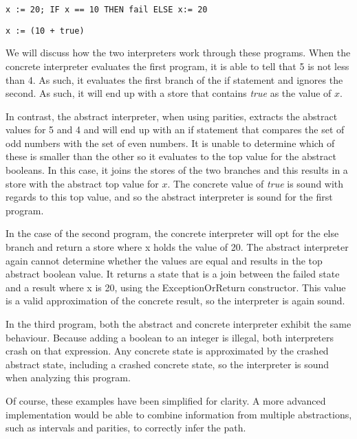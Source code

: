 \begin{lstlisting}
x := 20; IF x == 10 THEN fail ELSE x:= 20
\end{lstlisting}

\begin{lstlisting}
x := (10 + true)
\end{lstlisting}

We will discuss how the two interpreters work through these programs. When the
concrete interpreter evaluates the first program, it is able to tell that 5 is
not less than 4. As such, it evaluates the first branch of the if statement and
ignores the second. As such, it will end up with a store that contains
\textit{true} as the value of $x$.

In contrast, the abstract interpreter, when using parities, extracts the 
abstract values for 5 and 4
and will end up with an if statement that compares the set of odd numbers with
the set of even numbers. It is unable to determine which of these is smaller
than the other so it evaluates to the top value for the abstract booleans. In
this case, it joins the stores of the two branches and this results in a store
with the abstract top value for $x$. The concrete value of \textit{true} is
sound with regards to this top value, and so the abstract interpreter is sound
for the first program.

In the case of the second program, the concrete interpreter will opt for the
else branch and return a store where x holds the value of 20. The abstract
interpreter again cannot determine whether the values are equal and results in
the top abstract boolean value. It returns a state that is a join between the
failed state and a result where x is 20, using the ExceptionOrReturn
constructor. This value is a valid approximation of the concrete result, so the
interpreter is again sound.

In the third program, both the abstract and concrete interpreter exhibit the
same behaviour. Because adding a boolean to an integer is illegal, both
interpreters crash on that expression. Any concrete state is approximated by
the crashed abstract state, including a crashed concrete state, so the
interpreter is sound when analyzing this program.

Of course, these examples have been simplified for clarity. A more advanced
implementation would be able to combine information from multiple abstractions,
such as intervals and parities, to correctly infer the path. 

